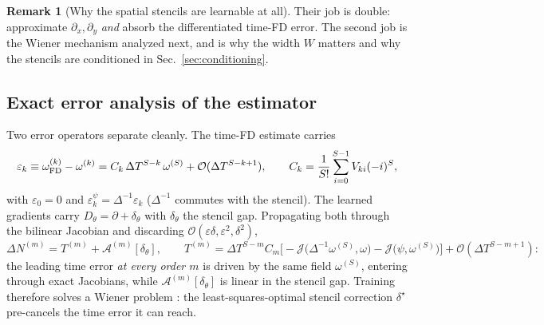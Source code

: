\documentclass[11pt]{article}
\theoremstyle{plain}
\theoremstyle{definition}
\newtheorem{remark}{Remark}
\newcommand{\Jop}{\mathcal{J}}
\newcommand{\bO}{\mathcal{O}}
\newcommand{\DT}{\Delta T}
\begin{document}
\begin{remark}[Why the spatial stencils are learnable at all]
Their job is double: approximate $\partial_x,\partial_y$ \emph{and} absorb the
differentiated time-FD error. The second job is the Wiener mechanism analyzed
next, and is why the width $W$ matters and why the stencils are conditioned
in Sec.~\ref{sec:conditioning}.
\end{remark}

\subsection{Exact error analysis of the estimator}
\label{sec:wiener}
Two error operators separate cleanly. The time-FD estimate carries
\begin{equation}
\varepsilon_k\equiv\omega^{(k)}_{\rm FD}-\omega^{(k)}
=C_k\,\DT^{S-k}\,\omega^{(S)}+\bO(\DT^{S-k+1}),\qquad
C_k=\frac1{S!}\sum_{i=0}^{S-1}V_{ki}(-i)^S,
\label{eq:eps-k}
\end{equation}
with $\varepsilon_0=0$ and $\varepsilon^\psi_k=\Delta^{-1}\varepsilon_k$
($\Delta^{-1}$ commutes with the stencil). The learned gradients carry
$D_\theta=\partial+\delta_\theta$ with $\delta_\theta$ the stencil gap.
Propagating both through the bilinear Jacobian and discarding
$\bO(\varepsilon\delta,\varepsilon^2,\delta^2)$,
\begin{equation}
\Delta N^{(m)}=T^{(m)}+\mathcal A^{(m)}[\delta_\theta],\qquad
T^{(m)}=\DT^{S-m}C_m\Big[-\Jop\big(\Delta^{-1}\omega^{(S)},\omega\big)
-\Jop\big(\psi,\omega^{(S)}\big)\Big]+\bO(\DT^{S-m+1}):
\label{eq:DeltaN}
\end{equation}
the leading time error \emph{at every order $m$} is driven by the same field
$\omega^{(S)}$, entering through exact Jacobians, while
$\mathcal A^{(m)}[\delta_\theta]$ is linear in the stencil gap. Training
therefore solves a Wiener problem \citep{wiener1949}: the
least-squares-optimal stencil correction $\delta^\star$ pre-cancels the time
error it can reach.
\end{document}
